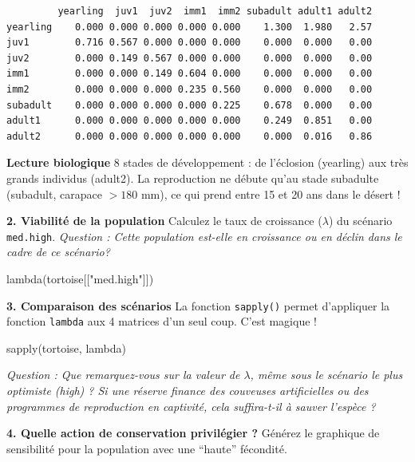 \documentclass[
  french,
  a4paper,
  DIV=11,
  numbers=noendperiod,
  oneside]{scrreprt}
\newenvironment{Shaded}{}{}
\newcommand{\FunctionTok}[1]{\textcolor[rgb]{0.44,0.26,0.76}{#1}}
\newcommand{\NormalTok}[1]{\textcolor[rgb]{0.14,0.16,0.18}{#1}}
\newcommand{\StringTok}[1]{\textcolor[rgb]{0.01,0.18,0.38}{#1}}
\begin{document}
\begin{verbatim}
         yearling  juv1  juv2  imm1  imm2 subadult adult1 adult2
yearling    0.000 0.000 0.000 0.000 0.000    1.300  1.980   2.57
juv1        0.716 0.567 0.000 0.000 0.000    0.000  0.000   0.00
juv2        0.000 0.149 0.567 0.000 0.000    0.000  0.000   0.00
imm1        0.000 0.000 0.149 0.604 0.000    0.000  0.000   0.00
imm2        0.000 0.000 0.000 0.235 0.560    0.000  0.000   0.00
subadult    0.000 0.000 0.000 0.000 0.225    0.678  0.000   0.00
adult1      0.000 0.000 0.000 0.000 0.000    0.249  0.851   0.00
adult2      0.000 0.000 0.000 0.000 0.000    0.000  0.016   0.86
\end{verbatim}

\textbf{Lecture biologique} 8 stades de développement : de l'éclosion
(yearling) aux très grands individus (adult2). La reproduction ne débute
qu'au stade subadulte (subadult, carapace \(>180\) mm), ce qui prend
entre 15 et 20 ans dans le désert !

\textbf{2. Viabilité de la population} Calculez le taux de croissance
(\(\lambda\)) du scénario \texttt{med.high}. \emph{Question : Cette
population est-elle en croissance ou en déclin dans le cadre de ce
scénario?}

\begin{Shaded}
\begin{Highlighting}[]
\FunctionTok{lambda}\NormalTok{(tortoise[[}\StringTok{"med.high"}\NormalTok{]])}
\end{Highlighting}
\end{Shaded}

\textbf{3. Comparaison des scénarios} La fonction \texttt{sapply()}
permet d'appliquer la fonction \texttt{lambda} aux 4 matrices d'un seul
coup. C'est magique !

\begin{Shaded}
\begin{Highlighting}[]
\FunctionTok{sapply}\NormalTok{(tortoise, lambda)}
\end{Highlighting}
\end{Shaded}

\emph{Question : Que remarquez-vous sur la valeur de \(\lambda\), même
sous le scénario le plus optimiste (high) ? Si une réserve finance des
couveuses artificielles ou des programmes de reproduction en captivité,
cela suffira-t-il à sauver l'espèce ?}

\textbf{4. Quelle action de conservation privilégier ?} Générez le
graphique de sensibilité pour la population avec une ``haute''
fécondité.
\end{document}
